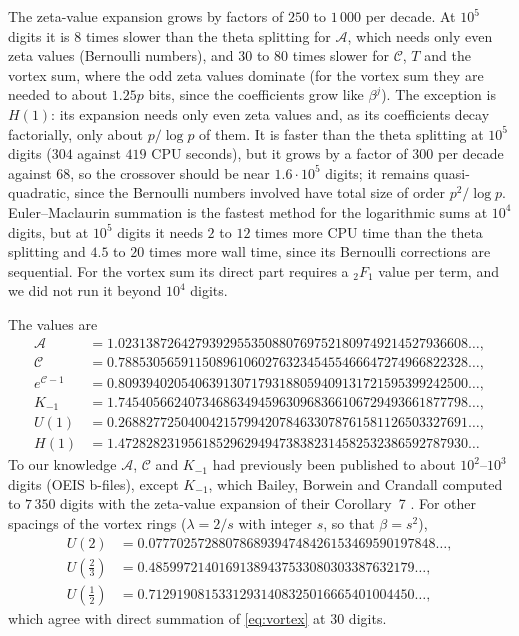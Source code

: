 \documentclass[11pt,reqno]{amsart}
\theoremstyle{definition}
\theoremstyle{remark}
\begin{document}
The zeta-value expansion grows by factors of $250$ to $1\,000$ per decade. At $10^5$ digits it is $8$ times slower than
the theta splitting for $\mathcal A$, which needs only even zeta values (Bernoulli numbers), and $30$ to $80$ times
slower for $\mathcal C$, $T$ and the vortex sum, where the odd zeta values dominate (for the vortex sum they are
needed to about $1.25p$ bits, since the coefficients grow like $\beta^j$). The exception is $H(1)$: its expansion needs
only even zeta values and, as its coefficients decay factorially, only about $p/\log p$ of them. It is faster than the
theta splitting at $10^5$ digits ($304$ against $419$ CPU seconds), but it grows by a factor of $300$ per decade
against $68$, so the crossover should be near $1.6\cdot10^5$ digits; it remains quasi-quadratic, since the Bernoulli
numbers involved have total size of order $p^2/\log p$. Euler--Maclaurin summation is the fastest method for the
logarithmic sums at $10^4$ digits, but at $10^5$ digits it needs $2$ to $12$ times more CPU time than the theta
splitting and $4.5$ to $20$ times more wall time, since its Bernoulli corrections are sequential. For the vortex sum its
direct part requires a ${}_2F_1$ value per term, and we did not run it beyond $10^4$ digits.

The values are
\begin{align*}
  \mathcal A &= 1.02313872642793929553508807697521809749214527936608\ldots, \\
  \mathcal C &= 0.78853056591150896106027632345455466647274966822328\ldots, \\
  e^{\mathcal C-1} &= 0.80939402054063913071793188059409131721595399242500\ldots, \\
  K_{-1} &= 1.74540566240734686349459630968366106729493661877798\ldots, \\
  U(1) &= 0.26882772504004215799420784633078761581126503327691\ldots, \\
  H(1) &= 1.47282823195618529629494738382314582532386592787930\ldots
\end{align*}
To our knowledge $\mathcal A$, $\mathcal C$ and $K_{-1}$ had previously been published to about $10^2$--$10^3$ digits
(OEIS b-files), except $K_{-1}$, which Bailey, Borwein and Crandall computed to $7\,350$ digits with the zeta-value
expansion of their Corollary~7 \cite{BBC97}. For other spacings of the vortex rings ($\lambda = 2/s$ with integer $s$,
so that $\beta = s^2$),
\begin{align*}
  U(2) &= 0.07770257288078689394748426153469590197848\ldots, \\
  U(\tfrac23) &= 0.48599721401691389437533080303387632179\ldots, \\
  U(\tfrac12) &= 0.71291908153312931408325016665401004450\ldots,
\end{align*}
which agree with direct summation of \eqref{eq:vortex} at $30$ digits.
\end{document}
